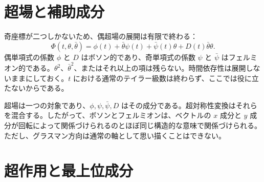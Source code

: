 \begin{classroomqa}
\end{classroomqa}

\section{超場と補助成分}

奇座標が二つしかないため、偶超場の展開は有限で終わる：
\begin{equation}
\Phi(t,\theta,\bar\theta)
=\phi(t)+\bar\theta\psi(t)+\bar\psi(t)\theta
+D(t)\bar\theta\theta.
\label{eq:l7-superfield}
\end{equation}
偶単項式の係数 \(\phi\) と \(D\) はボソン的であり、奇単項式の係数 \(\psi\) と \(\bar\psi\) はフェルミオン的である。\(\theta^2\)、\(\bar\theta^2\)、またはそれ以上の項は残らない。時間依存性は展開しないままにしておく。\(t\) における通常のテイラー級数は終わらず、ここでは役に立たないからである。

\begin{classroomqa}
\end{classroomqa}

超場は一つの対象であり、\(\phi,\psi,\bar\psi,D\) はその成分である。超対称性変換はそれらを混合する。したがって、ボソンとフェルミオンは、ベクトルの \(x\) 成分と \(y\) 成分が回転によって関係づけられるのとほぼ同じ構造的な意味で関係づけられる。ただし、グラスマン方向は通常の軸として思い描くことはできない。

\section{超作用と最上位成分}


